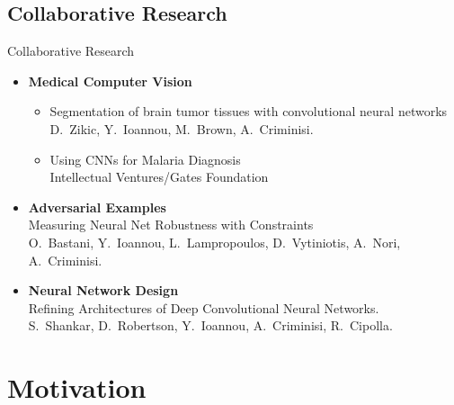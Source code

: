 \documentclass[t,xcolor=dvipsnames]{beamer}
\begin{document}
\subsection{Collaborative Research}
\begin{frame}{Collaborative Research}
\begin{itemize}
    \item \textbf{Medical Computer Vision}
    \begin{itemize}
        \item Segmentation of brain tumor tissues with convolutional neural networks\\{\footnotesize D.\ Zikic, Y.\ Ioannou, M.\ Brown, A.\ Criminisi.}\\%
        \item Using CNNs for Malaria Diagnosis\\{\footnotesize Intellectual Ventures/Gates Foundation}
    \end{itemize}
    \item \textbf{Adversarial Examples}\\Measuring Neural Net Robustness with Constraints\\{\footnotesize O.\ Bastani, Y.\ Ioannou, L.\ Lampropoulos, D.\ Vytiniotis, A.\ Nori, A.\ Criminisi.}%
    \item \textbf{Neural Network Design}\\Refining Architectures of Deep Convolutional Neural Networks.\\{\footnotesize 
S.\ Shankar, D.\ Robertson, Y.\ Ioannou, A.\ Criminisi, R.\ Cipolla.}%
\end{itemize}
\end{frame}


\section{Motivation}

\end{document}
